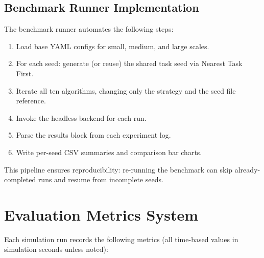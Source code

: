 \subsection{Benchmark Runner Implementation}

The benchmark runner automates the following steps:

\begin{enumerate}[leftmargin=4em]
    \item Load base YAML configs for small, medium, and large scales.
    \item For each seed: generate (or reuse) the shared task seed via Nearest Task First.
    \item Iterate all ten algorithms, changing only the strategy and the seed file reference.
    \item Invoke the headless backend for each run.
    \item Parse the results block from each experiment log.
    \item Write per-seed CSV summaries and comparison bar charts.
\end{enumerate}

This pipeline ensures reproducibility: re-running the benchmark can skip already-completed runs and resume from incomplete seeds.

\section{Evaluation Metrics System}

Each simulation run records the following metrics (all time-based values in simulation seconds unless noted):

